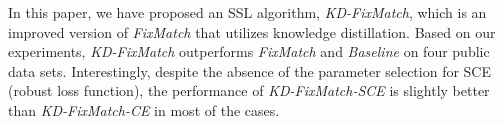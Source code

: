 \documentclass{article}
\begin{document}
In this paper, we have proposed an SSL algorithm, {\sl KD-FixMatch}, which is an improved version of {\sl FixMatch} that utilizes knowledge distillation.
Based on our experiments, {\sl KD-FixMatch} outperforms {\sl FixMatch} and {\sl Baseline} on four public data sets.
Interestingly, despite the absence of the parameter selection for SCE (robust loss function), the performance of {\sl KD-FixMatch-SCE} is slightly better than {\sl KD-FixMatch-CE} in most of the cases.

\end{document}
